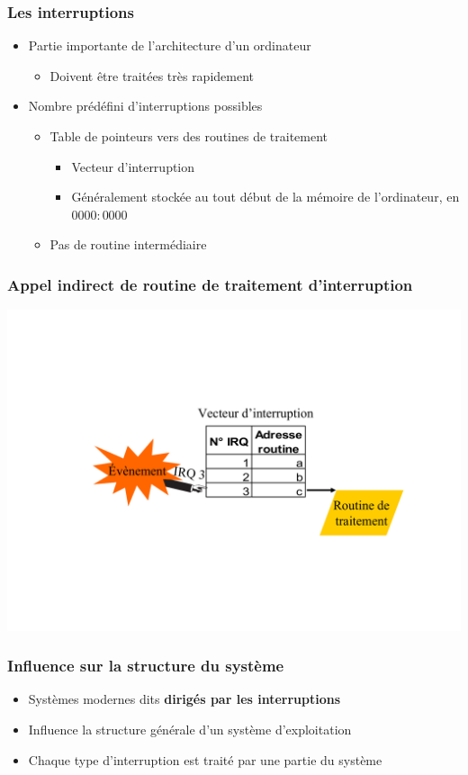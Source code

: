 \begin{frame}
 \frametitle{Les interruptions}
 \begin{itemize}
 \item Partie importante de l’architecture d’un ordinateur
\begin{itemize}
\item Doivent être traitées très rapidement
\end{itemize}
\item Nombre prédéfini d’interruptions possibles
\begin{itemize}
\item Table de pointeurs vers des routines de traitement
\begin{itemize}
\item Vecteur d’interruption
\item Généralement stockée au tout début de la mémoire de l'ordinateur, en $0000:0000$
\end{itemize}
\item Pas de routine intermédiaire
\end{itemize}
 \end{itemize}
\end{frame}


\begin{frame}
 \frametitle{Appel indirect de routine de traitement d’interruption}
 \includegraphics[width=\textwidth]{../illustration/derout_interruption.pdf}
\end{frame}


\begin{frame}
 \frametitle{Influence sur la structure du système}
 \begin{itemize}
 \item Systèmes modernes dits \textbf{dirigés par les interruptions}
 \item Influence la structure générale d’un système d’exploitation
 \item Chaque type d’interruption est traité par une partie du système
 \end{itemize}
\end{frame}


